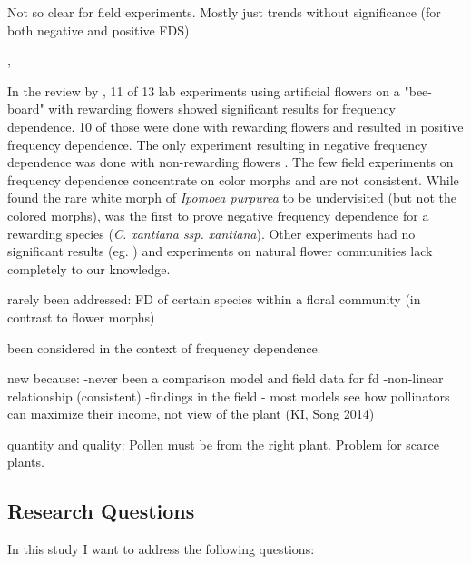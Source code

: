\begin{itemize}
\citep{smithson1996frequency}
\citep{smithson1997negative}


Not so clear for field experiments. Mostly just trends without significance (for both negative and positive FDS)

\citealt{Eckhart2006frequency}
\citealt{epperson1987frequency}
\citealt{gigord2001negative}, 
\citealt{jones1996pollinator}


In the review by \cite{smithson2001pollinator}, 11 of 13 lab experiments using artificial flowers on a "bee-board" with rewarding flowers showed significant results for frequency dependence. 10 of those were done with rewarding flowers and resulted in positive frequency dependence. The only experiment resulting in negative frequency dependence was done with non-rewarding flowers \citep{smithson1997negative}. The few field experiments on frequency dependence concentrate on color morphs and are not consistent. While \cite{epperson1987frequency} found the rare white morph of \textit{Ipomoea purpurea} to be undervisited (but not the colored morphs), \cite{Eckhart2006frequency} was the first to prove negative frequency dependence for a rewarding species (\textit{C. xantiana ssp. xantiana}). Other experiments had no significant results (eg. \citealt{jones1996pollinator}) and experiments on natural flower communities lack completely to our knowledge. 


rarely been addressed: 
FD of certain species within a floral community (in contrast to flower morphs)

been considered in the context of frequency dependence.


new because: 
-never been a comparison model and field data for fd
-non-linear relationship (consistent)
-findings in the field
- most models see how pollinators can maximize their income, not view of the plant (KI, Song 2014)

\end{itemize}


quantity and quality: Pollen must be from the right plant. Problem for scarce plants. 



\subsection*{Research Questions}
In this study I want to address the following questions: 

